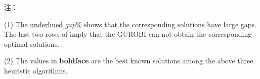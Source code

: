 \begin{table*}[!h]
\begin{threeparttable}
\begin{tabular}{lcrrrrrrrrrrrrrrrr}
			\bottomrule
		\end{tabular}
		\begin{tablenotes}
			\footnotesize
            \item 注：
			\item (1) The \underline{underlined} $gap\%$ shows that the corresponding solutions have large gaps. The last two rows of  imply that the GUROBI can not obtain the corresponding optimal solutions. 
            \item (2) The values in \textbf{boldface} are the best known solutions among the above three heuristic algorithms. 
		\end{tablenotes}
	\end{threeparttable}
\end{table*}



